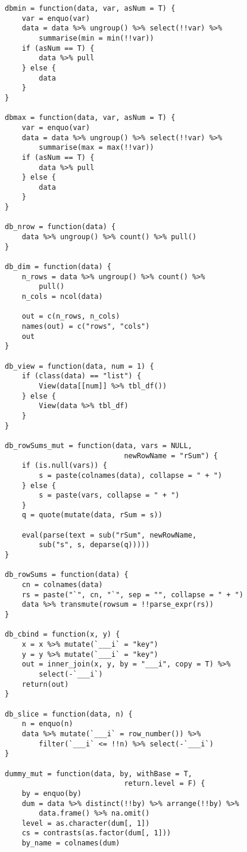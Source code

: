 \begin{lstlisting}
dbmin = function(data, var, asNum = T) {
    var = enquo(var)
    data = data %>% ungroup() %>% select(!!var) %>% 
        summarise(min = min(!!var))
    if (asNum == T) {
        data %>% pull
    } else {
        data
    }
}

dbmax = function(data, var, asNum = T) {
    var = enquo(var)
    data = data %>% ungroup() %>% select(!!var) %>% 
        summarise(max = max(!!var))
    if (asNum == T) {
        data %>% pull
    } else {
        data
    }
}

db_nrow = function(data) {
    data %>% ungroup() %>% count() %>% pull()
}

db_dim = function(data) {
    n_rows = data %>% ungroup() %>% count() %>% 
        pull()
    n_cols = ncol(data)
    
    out = c(n_rows, n_cols)
    names(out) = c("rows", "cols")
    out
}

db_view = function(data, num = 1) {
    if (class(data) == "list") {
        View(data[[num]] %>% tbl_df())
    } else {
        View(data %>% tbl_df)
    }
}

db_rowSums_mut = function(data, vars = NULL, 
                            newRowName = "rSum") {
    if (is.null(vars)) {
        s = paste(colnames(data), collapse = " + ")
    } else {
        s = paste(vars, collapse = " + ")
    }
    q = quote(mutate(data, rSum = s))
    
    eval(parse(text = sub("rSum", newRowName, 
        sub("s", s, deparse(q)))))
}

db_rowSums = function(data) {
    cn = colnames(data)
    rs = paste("`", cn, "`", sep = "", collapse = " + ")
    data %>% transmute(rowsum = !!parse_expr(rs))
}

db_cbind = function(x, y) {
    x = x %>% mutate(`___i` = "key")
    y = y %>% mutate(`___i` = "key")
    out = inner_join(x, y, by = "___i", copy = T) %>% 
        select(-`___i`)
    return(out)
}

db_slice = function(data, n) {
    n = enquo(n)
    data %>% mutate(`___i` = row_number()) %>% 
        filter(`___i` <= !!n) %>% select(-`___i`)
}

dummy_mut = function(data, by, withBase = T, 
                            return.level = F) {
    by = enquo(by)
    dum = data %>% distinct(!!by) %>% arrange(!!by) %>% 
        data.frame() %>% na.omit()
    level = as.character(dum[, 1])
    cs = contrasts(as.factor(dum[, 1]))
    by_name = colnames(dum)
    

\end{lstlisting}
